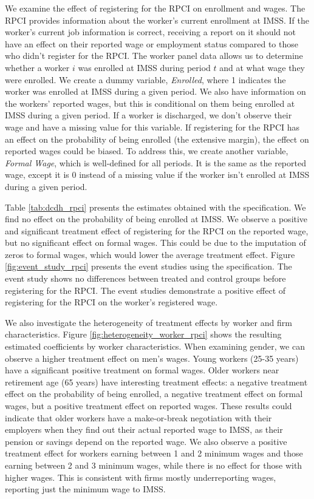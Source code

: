\documentclass[oneside,11pt]{article}
\begin{document}
We examine the effect of registering for the RPCI on enrollment and wages. The RPCI provides information about the worker's current enrollment at IMSS. If the worker's current job information is correct, receiving a report on it should not have an effect on their reported wage or employment status compared to those who didn't register for the RPCI. The worker panel data allows us to determine whether a worker $i$ was enrolled at IMSS during period $t$ and at what wage they were enrolled. We create a dummy variable, \textit{Enrolled}, where 1 indicates the worker was enrolled at IMSS during a given period. We also have information on the workers' reported wages, but this is conditional on them being enrolled at IMSS during a given period. If a worker is discharged, we don't observe their wage and have a missing value for this variable. If registering for the RPCI has an effect on the probability of being enrolled (the extensive margin), the effect on reported wages could be biased. To address this, we create another variable, \textit{Formal Wage}, which is well-defined for all periods. It is the same as the reported wage, except it is 0 instead of a missing value if the worker isn't enrolled at IMSS during a given period.

Table \ref{tab:dcdh_rpci} presents the estimates obtained with the \cite{de2020two} specification. We find no effect on the probability of being enrolled at IMSS. We observe a positive and significant treatment effect of registering for the RPCI on the reported wage, but no significant effect on formal wages. This could be due to the imputation of zeros to formal wages, which would lower the average treatment effect. Figure \ref{fig:event_study_rpci} presents the event studies using the \cite{de2020two} specification. The event study shows no differences between treated and control groups before registering for the RPCI. The event studies demonstrate a positive effect of registering for the RPCI on the worker's registered wage.

We also investigate the heterogeneity of treatment effects by worker and firm characteristics. Figure \ref{fig:heterogeneity_worker_rpci} shows the resulting estimated coefficients by worker characteristics. When examining gender, we can observe a higher treatment effect on men's wages. Young workers (25-35 years) have a significant positive treatment on formal wages. Older workers near retirement age (65 years) have interesting treatment effects: a negative treatment effect on the probability of being enrolled, a negative treatment effect on formal wages, but a positive treatment effect on reported wages. These results could indicate that older workers have a make-or-break negotiation with their employers when they find out their actual reported wage to IMSS, as their pension or savings depend on the reported wage. We also observe a positive treatment effect for workers earning between 1 and 2 minimum wages and those earning between 2 and 3 minimum wages, while there is no effect for those with higher wages. This is consistent with firms mostly underreporting wages, reporting just the minimum wage to IMSS.
\end{document}

